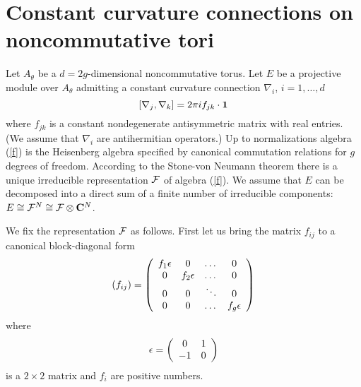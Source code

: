 \documentclass[a4paper,a4paper]{article}
\begin{document}
\section{Constant curvature connections on noncommutative tori}
Let $A_{\theta}$ be a $d=2g$-dimensional noncommutative torus.
Let $E$ be a projective module over $A_{\theta}$ admitting a constant
curvature connection $\nabla_{i}$, $i=1,\dots , d$ 
\begin{equation} \label{f}
[\nabla_{j}, \nabla_{k} ] = 2\pi  if_{jk} \cdot {\bf 1} 
\end{equation}
where $f_{jk}$ is a constant nondegenerate antisymmetric matrix with real entries. 
(We assume that $\nabla_{i}$ are antihermitian operators.)
Up to normalizations  algebra (\ref{f}) is the Heisenberg algebra 
specified by  canonical commutation relations for $g$ degrees of freedom. 
According to the Stone-von Neumann theorem there is a unique irreducible representation  $\cal F$ of  algebra (\ref{f}).
We assume that $E$ can be decomposed into a direct sum of a finite number of irreducible components: 
$E\cong {\cal F}^{N}\cong {\cal F}\otimes {\bf C}^{N}$. 


We fix the representation $\cal F$ as follows. First let us bring the matrix $f_{ij}$ to a canonical block-diagonal form 
\begin{equation} \label{cform}
(f_{ij})= \left( \begin{array}{cccc}
f_{1} {\bf \epsilon} & 0 & \dots & 0 \\
0 & f_{2} {\bf \epsilon} & \dots & 0 \\
0 & 0 & \ddots & 0 \\
0 & 0 & \dots  & f_{g}  {\bf \epsilon} 
\end{array} \right) 
\end{equation}
where 
\begin{equation} \label{epsilon}
{\bf \epsilon} = \left(
\begin{array}{cc} 0 & 1 \\ 
-1 & 0 \end{array} \right) 
\end{equation}
is a $2\times 2$ matrix 
and $f_{i}$ are positive numbers. 
\end{document}
